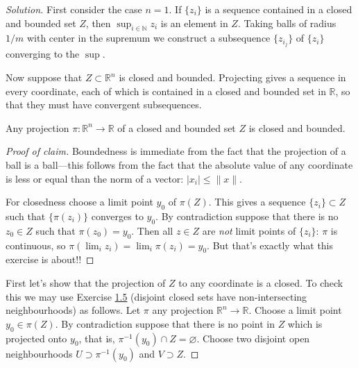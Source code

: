 \begin{proof}[Solution]\leavevmode
	First consider the case $n=1$. If  $\{z_i\}$ is a sequence contained in a closed and bounded set $Z$, then  $\operatorname{sup}_{i \in \mathbb{N}}z_i$ is an element in $Z$. Taking balls of radius $1/m$ with center in the supremum we construct a subsequence \(\{z_{i_j}\}\) of  $\{z_i\}$ converging to the $\operatorname{sup}$.

	Now suppose that $Z \subset\mathbb{R}^n$ is closed and bounded.
	Projecting gives a sequence in every coordinate, {\color{2}each of which is contained in a closed and bounded set in \(\mathbb{R}\)}, so that they must have convergent subsequences.

	\begin{claim}\leavevmode
		Any projection \(\pi:\mathbb{R}^n\to \mathbb{R}\) of a closed and bounded set \(Z\) is closed and bounded.
	\end{claim}
	\begin{proof}[Proof of claim]\leavevmode
	Boundedness is immediate from the fact that the projection of a ball is a ball---this follows from the fact that the absolute value of any coordinate is less or equal than the norm of a vector: \(|x_i|\leq \|x\|\).

	For closedness choose a limit point \(y_0\) of \(\pi(Z)\). This gives a sequence \(\{z_i\} \subset Z\) such that \(\{\pi(z_i)\}\) converges to \(y_0\). By contradiction suppose that there is no \(z_0 \in Z\) such that \(\pi(z_0)=y_0\). Then all \(z \in Z\) are \textit{not} limit points of \(\{z_i\}\): \(\pi\) is continuous, so \(\pi(\lim_{i} z_i)=\lim_{i} \pi(z_i)=y_0\). {\color{2}But that's exactly what this exercise is about!!}
	\end{proof}

\iffalse
First let's show that the projection of \(Z\) to any coordinate is a closed. To check this we may use Exercise \hyperref[exer:1.5]{1.5} (disjoint closed sets have non-intersecting neighbourhoods) as follows. Let \(\pi\) any projection \(\mathbb{R}^n \to \mathbb{R}\). Choose a limit point \(y_0 \in \pi(Z)\). By contradiction suppose that there is no point in \(Z\) which is projected onto \(y_0\), that is, \(\pi^{-1}(y_0) \cap Z=\varnothing\). Choose two disjoint open neighbourhoods \(U \supset \pi^{-1}(y_0)\) and \(V \supset Z\).


\end{proof}
